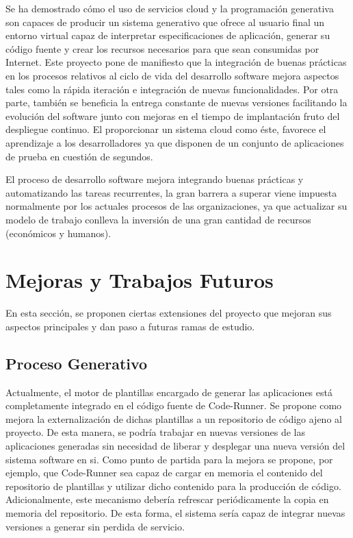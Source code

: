 \documentclass[a4paper,11pt]{book}
\begin{document}
Se ha demostrado cómo el uso de servicios cloud y la programación generativa son capaces de producir un sistema generativo que ofrece al usuario final un entorno virtual capaz de interpretar especificaciones de aplicación, generar su código fuente y crear los recursos necesarios para que sean consumidas por Internet.   Este proyecto pone de manifiesto que la integración de buenas prácticas en los procesos relativos al ciclo de vida del desarrollo software mejora aspectos tales como la rápida iteración e integración  de nuevas funcionalidades. Por otra parte, también se beneficia la entrega constante de nuevas versiones facilitando la evolución del software junto con mejoras en el tiempo de implantación fruto del despliegue continuo. El proporcionar un sistema cloud como éste, favorece el aprendizaje a los desarrolladores ya que disponen de un conjunto de aplicaciones de prueba en cuestión de segundos.  

 El proceso de desarrollo software mejora integrando buenas prácticas y automatizando las tareas recurrentes, la gran barrera a superar viene impuesta normalmente por los actuales procesos de las organizaciones, ya que actualizar su modelo de trabajo conlleva la inversión de una gran cantidad de recursos (económicos y humanos).

\section{Mejoras y Trabajos Futuros}

En esta sección, se proponen ciertas extensiones del proyecto que mejoran sus aspectos principales y dan paso a futuras ramas de estudio. 

\subsection{Proceso Generativo}

Actualmente, el motor de plantillas encargado de generar las aplicaciones está completamente integrado en el código fuente de Code-Runner. Se propone como mejora la externalización de dichas plantillas a un repositorio de código ajeno al proyecto. De esta manera, se podría trabajar en nuevas versiones de las aplicaciones generadas sin necesidad de liberar y desplegar una nueva versión del sistema software en si. Como punto de partida para la mejora se propone, por ejemplo, que Code-Runner sea capaz de cargar en memoria el contenido del repositorio de plantillas y utilizar dicho contenido para la producción de código. Adicionalmente, este mecanismo debería refrescar periódicamente la copia en memoria del repositorio. De esta forma, el sistema sería capaz de integrar nuevas versiones a generar sin perdida de servicio. 
\end{document}
